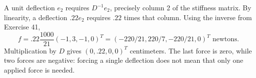 A unit deflection $e_2$ requires $D^{-1}e_2$, precisely column 2 of the
stiffness matrix. By linearity, a deflection $.22e_2$ requires $.22$ times
that column. Using the inverse from Exercise 41,
\[
 f=.22\frac{1000}{21}(-1,3,-1,0)^T
   =\boxed{(-220/21,220/7,-220/21,0)^T}\text{ newtons}.
\]
Multiplication by $D$ gives $(0,.22,0,0)^T$ centimeters. The last force is
zero, while two forces are negative: forcing a single deflection does not
mean that only one applied force is needed.
